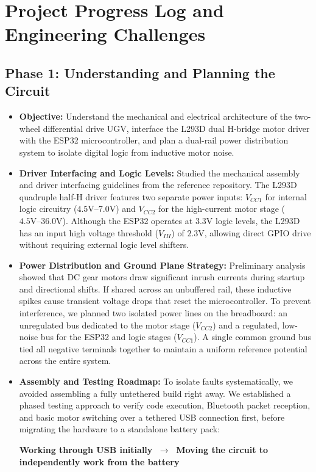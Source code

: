 \documentclass[journal,12pt,onecolumn]{IEEEtran}
\begin{document}
\section{\textbf{Project Progress Log and Engineering Challenges}}

\subsection*{\textbf{Phase 1}: Understanding and Planning the Circuit}
\begin{itemize}
	\item \textbf{Objective:} Understand the mechanical and electrical architecture of the two-wheel differential drive UGV, interface the L293D dual H-bridge motor driver with the ESP32 microcontroller, and plan a dual-rail power distribution system to isolate digital logic from inductive motor noise.
	
	\item \textbf{Driver Interfacing and Logic Levels:} Studied the mechanical assembly and driver interfacing guidelines from the reference repository. The L293D quadruple half-H driver features two separate power inputs: $V_{CC1}$ for internal logic circuitry ($4.5\text{V--}7.0\text{V}$) and $V_{CC2}$ for the high-current motor stage ($4.5\text{V--}36.0\text{V}$). Although the ESP32 operates at $3.3\text{V}$ logic levels, the L293D has an input high voltage threshold ($V_{IH}$) of $2.3\text{V}$, allowing direct GPIO drive without requiring external logic level shifters.
	
	\item \textbf{Power Distribution and Ground Plane Strategy:} Preliminary analysis showed that DC gear motors draw significant inrush currents during startup and directional shifts. If shared across an unbuffered rail, these inductive spikes cause transient voltage drops that reset the microcontroller. To prevent interference, we planned two isolated power lines on the breadboard: an unregulated bus dedicated to the motor stage ($V_{CC2}$) and a regulated, low-noise bus for the ESP32 and logic stages ($V_{CC1}$). A single common ground bus tied all negative terminals together to maintain a uniform reference potential across the entire system.
	
	\item \textbf{Assembly and Testing Roadmap:} To isolate faults systematically, we avoided assembling a fully untethered build right away. We established a phased testing approach to verify code execution, Bluetooth packet reception, and basic motor switching over a tethered USB connection first, before migrating the hardware to a standalone battery pack:
	\begin{center}
		\textbf{Working through USB initially} $\;\boldsymbol{\longrightarrow}\;$ \textbf{Moving the circuit to independently work from the battery}
	\end{center}
\end{itemize}
\end{document}
